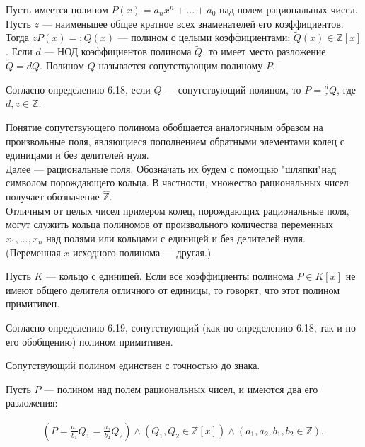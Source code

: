 \documentclass{article}
\begin{document}


Пусть имеется полином $P(x)=a_n x^n+\ldots +a_0$ над полем рациональных чисел. Пусть $z$ --- наименьшее общее кратное всех знаменателей его коэффициентов.
Тогда $zP(x)=:Q(x)$ --- полином с целыми коэффициентами: $\tilde{Q} (x)\in \mathbb{Z} [x]$.
Если $d$ ---  НОД коэффициентов полинома $\tilde{Q}$, то имеет место разложение $\tilde{Q} = dQ$. Полином $Q$  называется сопутствующим полиному $P$.\newline

Согласно определению 6.18, если $Q$ ---  сопутствующий полином, то $P = \frac{d}{z}Q$, где $d, z\in \mathbb{Z}$.\newline

Понятие сопутствующего полинома обобщается аналогичным образом на произвольные поля, являющиеся пополнением обратными элементами колец с единицами и без делителей нуля.\\
Далее --- рациональные поля. Обозначать их будем с помощью "шляпки"над символом порождающего кольца. В частности, множество рациональных чисел получает обозначение $\widehat{\mathbb{Z}}$.\\
Отличным от целых чисел примером колец, порождающих рациональные поля, могут служить кольца полиномов от произвольного количества переменных $x_1,...,x_n$ над полями или кольцами с единицей и без делителей нуля.
(Переменная $x$ исходного полинома — другая.)


Пусть $K$ --- кольцо с единицей. Если все коэффициенты полинома $P\in K[x]$
не имеют общего делителя отличного от единицы, то говорят, что этот полином
примитивен.\newline

Согласно определению 6.19, сопутствующий (как по определению 6.18, так
и по его обобщению) полином примитивен.

\theorem[6.29]

Сопутствующий полином единствен с точностью до знака.

\proof

Пусть $P$ --- полином над полем рациональных чисел, и имеются два его разложения:

\begin{align*}
	(P =\frac{a_1}{b_1} Q_1 = \frac{a_2}{b_2} Q_2)\land (Q_1, Q_2\in \mathbb{Z} [x])\land (a_1, a_2, b_1, b_2\in \mathbb{Z}),
\end{align*}
\end{document}
